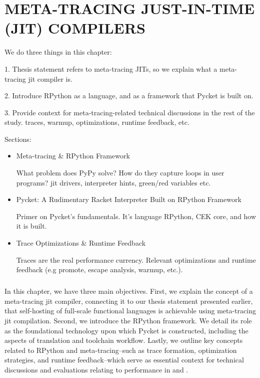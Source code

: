 \chapter[\texorpdfstring{META-TRACING JUST-IN-TIME (JIT) COMPILERS}
                          {2. RPython \& Meta-tracing}]{META-TRACING JUST-IN-TIME (JIT) COMPILERS}
    \label{chapter:rpython}

    \begin{chaptersynopsis}
        \footnotesize

        We do three things in this chapter:

        1. Thesis statement refers to meta-tracing JITs, so we explain what a meta-tracing \gls{jit} compiler is.

        2. Introduce RPython as a language, and as a framework that Pycket is built on.

        3. Provide context for meta-tracing-related technical discussions in the rest of the study. traces, warmup, optimizations, runtime feedback, etc.

        \vspace{2em}

        Sections:
		\begin{itemize}
			\item Meta-tracing \& RPython Framework

                What problem does PyPy solve? How do they capture loops in user programs? \gls{jit} drivers, interpreter hints, green/red variables etc.
			\item Pycket: A Rudimentary Racket Interpreter Built on RPython Framework

                Primer on Pycket's fundamentals. It's language RPython, CEK core, and how it is built.
			\item Trace Optimizations \& Runtime Feedback

                Traces are the real performance currency. Relevant optimizations and runtime feedback (e.g promote, escape analysis, warmup, etc.).
		\end{itemize}
    \end{chaptersynopsis}

    \paragraph{}%
        In this chapter, we have three main objectives. First, we explain the concept of a meta-tracing \gls{jit} compiler, connecting it to our thesis statement presented earlier, that self-hosting of full-scale functional languages is achievable using meta-tracing \gls{jit} compilation. Second, we introduce the RPython framework. We detail its role as the foundational technology upon which Pycket is constructed, including the aspects of translation and toolchain workflow. Lastly, we outline key concepts related to RPython and meta-tracing--such as trace formation, optimization strategies, and runtime feedback--which serve as essential context for technical discussions and evaluations relating to performance in  and .

